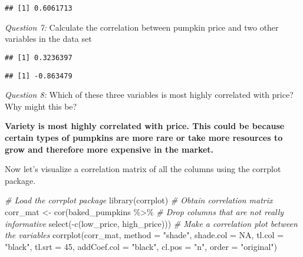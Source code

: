 \documentclass[
]{article}
\newenvironment{Shaded}{\begin{snugshade}}{\end{snugshade}}
\newcommand{\AttributeTok}[1]{\textcolor[rgb]{0.77,0.63,0.00}{#1}}
\newcommand{\CommentTok}[1]{\textcolor[rgb]{0.56,0.35,0.01}{\textit{#1}}}
\newcommand{\ConstantTok}[1]{\textcolor[rgb]{0.00,0.00,0.00}{#1}}
\newcommand{\DecValTok}[1]{\textcolor[rgb]{0.00,0.00,0.81}{#1}}
\newcommand{\FunctionTok}[1]{\textcolor[rgb]{0.00,0.00,0.00}{#1}}
\newcommand{\NormalTok}[1]{#1}
\newcommand{\OtherTok}[1]{\textcolor[rgb]{0.56,0.35,0.01}{#1}}
\newcommand{\SpecialCharTok}[1]{\textcolor[rgb]{0.00,0.00,0.00}{#1}}
\newcommand{\StringTok}[1]{\textcolor[rgb]{0.31,0.60,0.02}{#1}}
\begin{document}
\begin{verbatim}
## [1] 0.6061713
\end{verbatim}

\emph{Question 7:} Calculate the correlation between pumpkin price and
two other variables in the data set

\begin{Shaded}
\end{Shaded}

\begin{verbatim}
## [1] 0.3236397
\end{verbatim}

\begin{Shaded}
\end{Shaded}

\begin{verbatim}
## [1] -0.863479
\end{verbatim}

\emph{Question 8:} Which of these three variables is most highly
correlated with price? Why might this be?

\textbf{Variety is most highly correlated with price. This could be
because certain types of pumpkins are more rare or take more resources
to grow and therefore more expensive in the market.}

Now let's visualize a correlation matrix of all the columns using the
corrplot package.

\begin{Shaded}
\begin{Highlighting}[]
\CommentTok{\# Load the corrplot package}
\FunctionTok{library}\NormalTok{(corrplot)}
\CommentTok{\# Obtain correlation matrix}
\NormalTok{corr\_mat }\OtherTok{\textless{}{-}} \FunctionTok{cor}\NormalTok{(baked\_pumpkins }\SpecialCharTok{\%\textgreater{}\%} 
                  \CommentTok{\# Drop columns that are not really informative}
                  \FunctionTok{select}\NormalTok{(}\SpecialCharTok{{-}}\FunctionTok{c}\NormalTok{(low\_price, high\_price)))}
\CommentTok{\# Make a correlation plot between the variables}
\FunctionTok{corrplot}\NormalTok{(corr\_mat, }\AttributeTok{method =} \StringTok{"shade"}\NormalTok{, }\AttributeTok{shade.col =} \ConstantTok{NA}\NormalTok{, }\AttributeTok{tl.col =} \StringTok{"black"}\NormalTok{, }\AttributeTok{tl.srt =} \DecValTok{45}\NormalTok{, }\AttributeTok{addCoef.col =} \StringTok{"black"}\NormalTok{, }\AttributeTok{cl.pos =} \StringTok{"n"}\NormalTok{, }\AttributeTok{order =} \StringTok{"original"}\NormalTok{)}
\end{Highlighting}
\end{Shaded}
\end{document}
